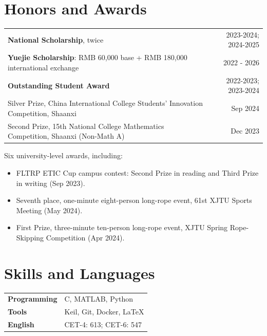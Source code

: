 \documentclass[10pt,a4paper]{article}
\begin{document}
\section{Honors and Awards}
\begin{tabularx}{\linewidth}{@{}X@{\hspace{1em}}r@{}}
\textbf{National Scholarship}, twice & 2023-2024; 2024-2025\\[3pt]
\textbf{Yuejie Scholarship}: RMB 60,000 base + RMB 180,000 international exchange & 2022 - 2026\\[3pt]
\textbf{Outstanding Student Award} & 2022-2023; 2023-2024\\[3pt]
Silver Prize, China International College Students' Innovation Competition, Shaanxi & Sep 2024\\[3pt]
Second Prize, 15th National College Mathematics Competition, Shaanxi (Non-Math A) & Dec 2023
\end{tabularx}
\vspace{3pt}
Six university-level awards, including:
\begin{itemize}
  \item FLTRP ETIC Cup campus contest: Second Prize in reading and Third Prize in writing (Sep 2023).
  \item Seventh place, one-minute eight-person long-rope event, 61st XJTU Sports Meeting (May 2024).
  \item First Prize, three-minute ten-person long-rope event, XJTU Spring Rope-Skipping Competition (Apr 2024).
\end{itemize}

\section{Skills and Languages}
\begin{tabularx}{\linewidth}{@{}p{25mm}X@{}}
\textbf{Programming} & C, MATLAB, Python\\[3pt]
\textbf{Tools} & Keil, Git, Docker, \LaTeX\\[3pt]
\textbf{English} & CET-4: 613; CET-6: 547
\end{tabularx}
\end{document}
